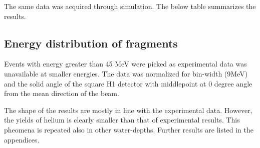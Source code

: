 The same data was acquired through simulation. The below table summarizes the results.



\subsection{Energy distribution of fragments}
Events with energy greater than 45 MeV were picked as experimental data was unavailable at smaller energies. The data was normalized for bin-width (9MeV) and the solid angle of the square H1 detector with middlepoint at 0 degree angle from the mean direction of the beam.

The shape of the results are mostly in line with the experimental data. However, the yields of helium is clearly smaller than that of experimental results. This pheomena is repeated also in other water-depths. Further results are listed in the appendices.

